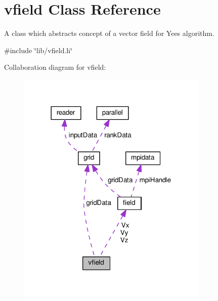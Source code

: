 \hypertarget{classvfield}{}\section{vfield Class Reference}
\label{classvfield}


A class which abstracts concept of a vector field for Yee\textquotesingle{}s algorithm.  




{\ttfamily \#include \char`\"{}lib/vfield.\+h\char`\"{}}



Collaboration diagram for vfield\+:\nopagebreak
\begin{figure}[H]
\begin{center}
\leavevmode
\includegraphics[width=258pt]{classvfield__coll__graph}
\end{center}
\end{figure}
